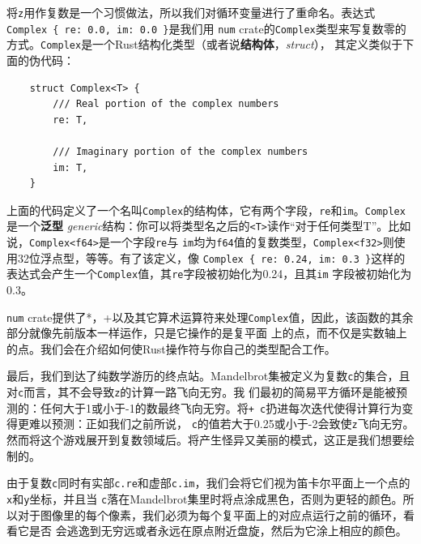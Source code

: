 \smallskip
将\texttt{z}用作复数是一个习惯做法，所以我们对循环变量进行了重命名。表达式\texttt{Complex \{ re: 0.0, im: 0.0 \}}是我们用
\texttt{num} crate的\texttt{Complex}类型来写复数零的方式。\texttt{Complex}是一个Rust结构化类型（或者说\textbf{结构体}，\textit{struct}），
其定义类似于下面的伪代码：
\begin{verbatim}
    struct Complex<T> {
        /// Real portion of the complex numbers
        re: T,

        /// Imaginary portion of the complex numbers
        im: T,
    }
\end{verbatim}

\smallskip
上面的代码定义了一个名叫\texttt{Complex}的结构体，它有两个字段，\texttt{re}和\texttt{im}。\texttt{Complex}是一个\textbf{泛型}
\textit{generic}结构：你可以将类型名之后的\texttt{<T>}读作“对于任何类型T”。比如说，\texttt{Complex<f64>}是一个字段\texttt{re}与
\texttt{im}均为\texttt{f64}值的复数类型，\texttt{Complex<f32>}则使用32位浮点型，等等。有了该定义，像
\texttt{Complex \{ re: 0.24, im: 0.3 \}}这样的表达式会产生一个\texttt{Complex}值，其\texttt{re}字段被初始化为0.24，且其\texttt{im}
字段被初始化为0.3。

\medskip
\texttt{num} crate提供了*，+以及其它算术运算符来处理\texttt{Complex}值，因此，该函数的其余部分就像先前版本一样运作，只是它操作的是复平面
上的点，而不仅是实数轴上的点。我们会在介绍如何使Rust操作符与你自己的类型配合工作。

\medskip
最后，我们到达了纯数学游历的终点站。Mandelbrot集被定义为复数\texttt{c}的集合，且对\texttt{c}而言，其不会导致\texttt{z}的计算一路飞向无穷。我
们最初的简易平方循环是能被预测的：任何大于1或小于-1的数最终飞向无穷。将\texttt{+ c}扔进每次迭代使得计算行为变得更难以预测：正如我们之前所说，
\texttt{c}的值若大于0.25或小于-2会致使\texttt{z}飞向无穷。然而将这个游戏展开到复数领域后。将产生怪异又美丽的模式，这正是我们想要绘制的。

\medskip
由于复数\texttt{c}同时有实部\texttt{c.re}和虚部\texttt{c.im}，我们会将它们视为笛卡尔平面上一个点的\texttt{x}和\texttt{y}坐标，并且当
\texttt{c}落在Mandelbrot集里时将点涂成黑色，否则为更轻的颜色。所以对于图像里的每个像素，我们必须为每个复平面上的对应点运行之前的循环，看看它是否
会逃逸到无穷远或者永远在原点附近盘旋，然后为它涂上相应的颜色。

